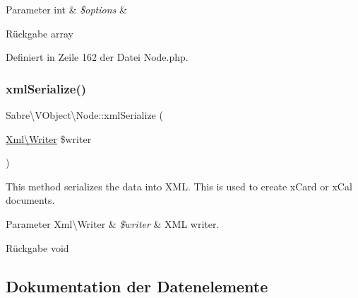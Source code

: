 \begin{DoxyParams}[1]{Parameter}
int & {\em \$options} & \\
\hline
\end{DoxyParams}
\begin{DoxyReturn}{Rückgabe}
array 
\end{DoxyReturn}


Definiert in Zeile 162 der Datei Node.\+php.

\mbox{\label{class_sabre_1_1_v_object_1_1_node_ab885518663b677a0eb10aae51256786e}} 
\subsubsection{\texorpdfstring{xml\+Serialize()}{xmlSerialize()}}
{\footnotesize\ttfamily Sabre\textbackslash{}\+V\+Object\textbackslash{}\+Node\+::xml\+Serialize (\begin{DoxyParamCaption}\item[{\mbox{\hyperlink{class_sabre_1_1_xml_1_1_writer}{Xml\textbackslash{}\+Writer}}}]{\$writer }\end{DoxyParamCaption})\hspace{0.3cm}{\ttfamily [abstract]}}

This method serializes the data into X\+ML. This is used to create x\+Card or x\+Cal documents.


\begin{DoxyParams}[1]{Parameter}
Xml\textbackslash{}\+Writer & {\em \$writer} & X\+ML writer.\\
\hline
\end{DoxyParams}
\begin{DoxyReturn}{Rückgabe}
void 
\end{DoxyReturn}


\subsection{Dokumentation der Datenelemente}
\mbox{\label{class_sabre_1_1_v_object_1_1_node_a1e68f819b7b5537929290e061ffeacc5}} 
